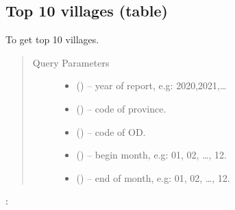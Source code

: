 \documentclass[letterpaper,10pt,english,openany,oneside]{sphinxmanual}
\begin{document}
\subsection{Top 10 villages (table)}
\label{\detokenize{api-cmi/v1:top-10-villages-table}}

\begin{fulllineitems}
\label{\detokenize{api-cmi/v1:get--api-malaria-info-v1-Surveillance-top_ten_village}}
\sphinxAtStartPar
To get top 10 villages.
\begin{quote}\begin{description}
\item[{Query Parameters}] \leavevmode\begin{itemize}
\item {} 
\sphinxAtStartPar
{} () – year of report, e.g: 2020,2021,…

\item {} 
\sphinxAtStartPar
{} () – code of province.

\item {} 
\sphinxAtStartPar
{} () – code of OD.

\item {} 
\sphinxAtStartPar
{} () – begin month, e.g: 01, 02, …, 12.

\item {} 
\sphinxAtStartPar
{} () – end of month, e.g: 01, 02, …, 12.

\end{itemize}

\end{description}\end{quote}

\sphinxAtStartPar
{}:


\end{fulllineitems}
\end{document}
